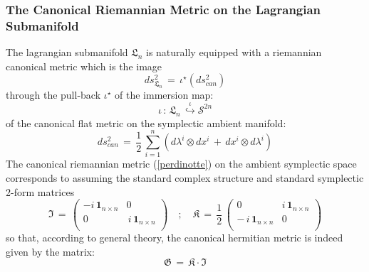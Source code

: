 \documentclass[10pt,a4paper]{article}
\newcommand{\ft}[2]{{\textstyle\frac{#1}{#2}}}
\begin{document}
\subsubsection{The Canonical  Riemannian Metric on the Lagrangian Submanifold}
The lagrangian submanifold $\mathfrak{L}_n$ is naturally
equipped with a riemannian canonical metric which is the image
\begin{equation}\label{barlengo}
    ds^2_{\mathfrak{L}_n}\, = \, \iota^\star\left(ds^2_{can}\right)
\end{equation}
through the pull-back $\iota^\star$ of the immersion map:
\begin{equation}\label{apnea}
    \iota \, : \, \mathfrak{L}_n \,
    \stackrel{\iota}{\hookrightarrow} \mathcal{S}^{2n}
\end{equation}
of the canonical flat metric on the symplectic ambient manifold:
\begin{equation}\label{perdinotte}
    ds^2_{can} \,=\, \ft 12 \, \sum_{i=1}^n \left(
    d\lambda^i\otimes dx^i\, +\, dx^i \otimes d\lambda^i\right)
\end{equation}
The canonical riemannian metric (\ref{perdinotte}) on the ambient symplectic space corresponds to assuming the standard complex structure and standard symplectic  2-form matrices
\begin{equation}\label{standcompstruc}
  \mathfrak{I}\, = \,\left(
                       \begin{array}{c|c}
                         -\mathit{i} \,\mathbf{1}_{n\times n} &  0\\
                         \hline
                       0 &   \, \mathit{i} \,\mathbf{1}_{n\times n}\\
                       \end{array}
                     \right) \quad ; \quad \mathfrak{K} \, = \, \ft 12 \,\left(
                       \begin{array}{c|c}
                       0 &  \mathit{i} \,\mathbf{1}_{n\times n} \\
                       \hline
                       - \, \mathit{i} \,\mathbf{1}_{n\times n} & 0 \\
                       \end{array}
                     \right)
\end{equation}
so that, according to general theory,  the canonical hermitian metric  is indeed given   by the matrix:
\begin{equation}\label{standhermitmet}
  \mathfrak{G} \, = \, \mathfrak{K}\cdot\mathfrak{I}
\end{equation}
\end{document}
